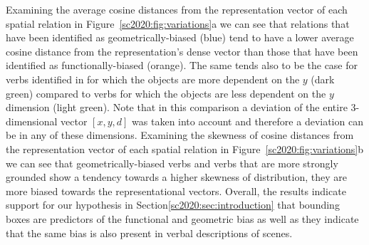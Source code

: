 Examining the average cosine distances from the representation vector
of each spatial relation in Figure~\ref{sc2020:fig:variations}a we can see
that relations that have been identified as geometrically-biased
(blue) tend to have a lower average cosine distance from the
representation's dense vector than those that have been identified as
functionally-biased (orange). The same tends also to be the case for
verbs identified in \cite{collell2018acquiring} for which the objects
are more dependent on the $y$ (dark green) compared to verbs for which
the objects are less dependent on the $y$ dimension (light
green). Note that in this comparison a deviation of the entire
3-dimensional vector $[x, y, d]$ was taken into account and therefore
a deviation can be in any of these dimensions. Examining the skewness
of cosine distances from the representation vector of each spatial
relation in Figure~\ref{sc2020:fig:variations}b we can see that
geometrically-biased verbs and verbs that are more strongly grounded
show a tendency towards a higher skewness of distribution, they are
more biased towards the representational vectors. Overall, the results
indicate support for our hypothesis in Section\ref{sc2020:sec:introduction}
that bounding boxes are predictors of the functional and geometric
bias as well as they indicate that the same bias is also present in
verbal descriptions of scenes.

